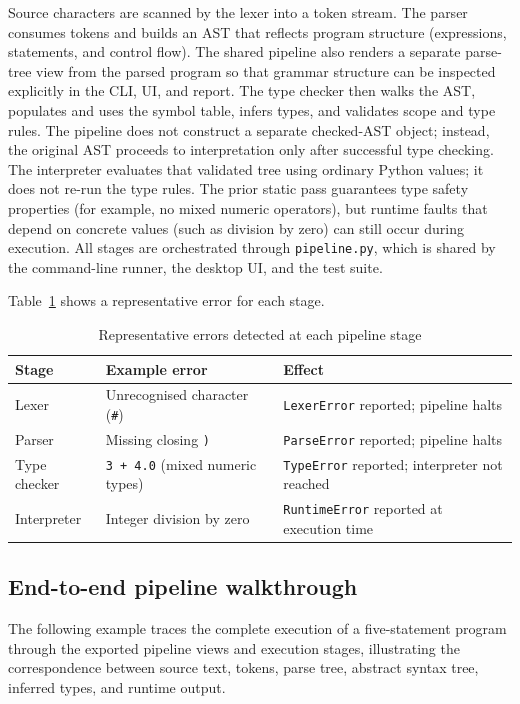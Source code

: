 Source characters are scanned by the lexer into a token stream. The parser
consumes tokens and builds an AST that reflects program structure (expressions,
statements, and control flow). The shared pipeline also renders a separate
parse-tree view from the parsed program so that grammar structure can be
inspected explicitly in the CLI, UI, and report. The type checker then walks the AST, populates and
uses the symbol table, infers types, and validates scope and type rules. The
pipeline does not construct a separate checked-AST object; instead, the
original AST proceeds to interpretation only after successful type checking.
The interpreter evaluates that validated tree using ordinary Python values; it
does not re-run the type rules. The prior static pass guarantees type safety
properties (for example, no mixed numeric operators), but runtime faults that
depend on concrete values (such as division by zero) can still occur during
execution.
All stages are orchestrated through \texttt{pipeline.py}, which is shared
by the command-line runner, the desktop UI, and the test suite.

Table~\ref{tab:pipeline-errors} shows a representative error for each stage.

\begin{table}[H]
\centering
\caption{Representative errors detected at each pipeline stage}
\label{tab:pipeline-errors}
\small
\begin{tabular}{p{2.8cm}p{4.5cm}p{5.5cm}}
\toprule
Stage & Example error & Effect \\
\midrule
Lexer        & Unrecognised character (\texttt{\#})   & \texttt{LexerError} reported; pipeline halts \\
Parser       & Missing closing \texttt{)}              & \texttt{ParseError} reported; pipeline halts \\
Type checker & \texttt{3 + 4.0} (mixed numeric types) & \texttt{TypeError} reported; interpreter not reached \\
Interpreter  & Integer division by zero                & \texttt{RuntimeError} reported at execution time \\
\bottomrule
\end{tabular}
\end{table}

\subsection{End-to-end pipeline walkthrough}

The following example traces the complete execution of a five-statement program
through the exported pipeline views and execution stages, illustrating the
correspondence between source text, tokens, parse tree, abstract syntax tree,
inferred types, and runtime output.

